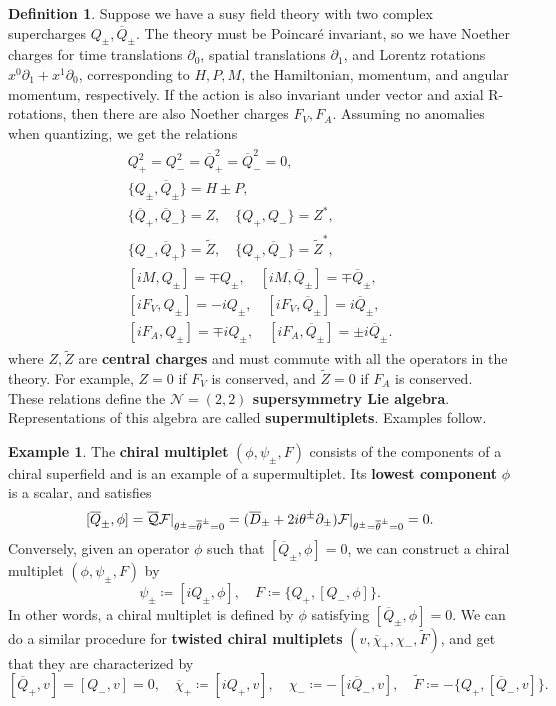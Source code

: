 \documentclass{report}
\theoremstyle{plain}
\theoremstyle{definition}
\newtheorem{definition}[theorem]{Definition}
\newtheorem{example}[theorem]{Example}
\theoremstyle{remark}
\newcommand{\di}{\partial}
\newcommand{\cN}{\mathcal{N}}
\newcommand{\cnj}{\overline}
\begin{document}
\begin{definition}
  Suppose we have a susy field theory with two complex supercharges
  $Q_\pm, \cnj Q_\pm$. The theory must be Poincar\'e invariant, so we
  have Noether charges for time translations $\di_0$, spatial
  translations $\di_1$, and Lorentz rotations $x^0\di_1 + x^1\di_0$,
  corresponding to $H, P, M$, the Hamiltonian, momentum, and angular
  momentum, respectively. If the action is also invariant under vector
  and axial R-rotations, then there are also Noether charges $F_V,
  F_A$. Assuming no anomalies when quantizing, we get the relations
  \begin{align}
  \begin{gathered} \label{eq:n22-susy-relations}
    Q_+^2 = Q_-^2 = \cnj Q_+^2 = \cnj Q_-^2 = 0, \\
    \{Q_\pm, \cnj Q_\pm\} = H \pm P, \\
    \{\cnj Q_+, \cnj Q_-\} = Z, \quad \{Q_+, Q_-\} = Z^*, \\
    \{Q_-, \cnj Q_+\} = \tilde Z, \quad \{Q_+, \cnj Q_-\} = \tilde Z^*, \\
    [iM, Q_\pm] = \mp Q_\pm, \quad [iM, \cnj Q_\pm] = \mp \cnj Q_\pm, \\
    [iF_V, Q_\pm] = -iQ_\pm, \quad [iF_V, \cnj Q_\pm] = i\cnj Q_\pm, \\
    [iF_A, Q_\pm] = \mp iQ_\pm, \quad [iF_A, \cnj Q_\pm] = \pm i\cnj Q_\pm.
  \end{gathered}
  \end{align}
  where $Z, \tilde Z$ are {\bf central charges} and must commute with
  all the operators in the theory. For example, $Z = 0$ if $F_V$ is
  conserved, and $\tilde Z = 0$ if $F_A$ is conserved. These relations
  define the {\bf $\cN = (2,2)$ supersymmetry Lie algebra}.
  Representations of this algebra are called {\bf supermultiplets}.
  Examples follow.
\end{definition}

\begin{example} \label{ex:chiral-multiplet}
  The {\bf chiral multiplet} $(\phi, \psi_\pm, F)$ consists of the
  components of a chiral superfield and is an example of a
  supermultiplet. Its {\bf lowest component} $\phi$ is a scalar, and
  satisfies
  \[ [\cnj Q_\pm, \phi] = \cnj{\cal Q} {\cal F}|_{\theta^\pm=\cnj\theta^\pm=0} = (\cnj D_\pm + 2i\theta^\pm \di_\pm) {\cal F}|_{\theta^\pm=\cnj\theta^\pm=0} = 0. \]
  Conversely, given an operator $\phi$ such that $[\cnj Q_\pm, \phi] =
  0$, we can construct a chiral multiplet $(\phi, \psi_\pm, F)$ by
  \[ \psi_\pm \coloneqq [iQ_\pm, \phi], \quad F \coloneqq \{Q_+, [Q_-, \phi]\}. \]
  In other words, a chiral multiplet is defined by $\phi$ satisfying
  $[\cnj Q_\pm, \phi] = 0$. We can do a similar procedure for {\bf
    twisted chiral multiplets} $(v, \cnj\chi_+, \chi_-, \tilde F)$,
  and get that they are characterized by
  \[ [\cnj Q_+, v] = [Q_-, v] = 0, \quad \cnj \chi_+ \coloneqq [iQ_+, v], \quad \chi_- \coloneqq -[i\cnj Q_-, v], \quad \tilde F \coloneqq -\{Q_+, [\cnj Q_-, v]\}. \]
\end{example}
\end{document}
